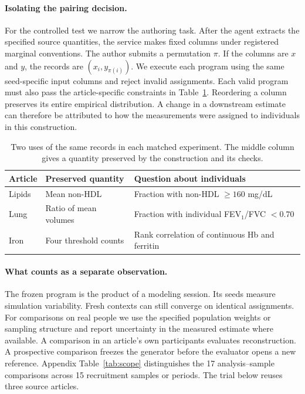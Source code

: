 \documentclass[sigconf,anonymous,review]{acmart}
\begin{document}
\paragraph{Isolating the pairing decision.}
For the controlled test we narrow the authoring task. After the agent extracts the specified source quantities, the service makes fixed columns under registered marginal conventions. The author submits a permutation $\pi$. If the columns are $x$ and $y$, the records are $(x_i,y_{\pi(i)})$. We execute each program using the same seed-specific input columns and reject invalid assignments. Each valid program must also pass the article-specific constraints in Table~\ref{tab:uses}. Reordering a column preserves its entire empirical distribution. A change in a downstream estimate can therefore be attributed to how the measurements were assigned to individuals in this construction.

\begin{table}[tbp]
\caption{Two uses of the same records in each matched experiment. The middle column gives a quantity preserved by the construction and its checks.}
\label{tab:uses}
\small\centering
\begin{tabular}{@{}p{}p{}p{}@{}}
\toprule
Article & Preserved quantity & Question about individuals\\
\midrule
Lipids & Mean non-HDL & Fraction with non-HDL $\ge160$ mg/dL\\
Lung & Ratio of mean volumes & Fraction with individual FEV$_1$/FVC $<0.70$\\
Iron & Four threshold counts & Rank correlation of continuous Hb and ferritin\\
\bottomrule
\end{tabular}
\end{table}

\paragraph{What counts as a separate observation.}
The frozen program is the product of a modeling session. Its seeds measure simulation variability. Fresh contexts can still converge on identical assignments. For comparisons on real people we use the specified population weights or sampling structure and report uncertainty in the measured estimate where available. A comparison in an article's own participants evaluates reconstruction. A prospective comparison freezes the generator before the evaluator opens a new reference. Appendix Table~\ref{tab:scope} distinguishes the 17 analysis--sample comparisons across 15 recruitment samples or periods. The trial below reuses three source articles.
\end{document}
